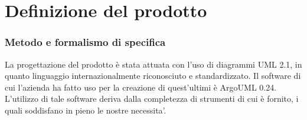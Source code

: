 \documentclass[11pt,titlepage,a4paper]{report}
\begin{document}
\chapter{Definizione del prodotto}
\subsection{Metodo e formalismo di specifica}
La progettazione del prodotto \`e stata attuata con l'uso di diagrammi UML 2.1, in quanto linguaggio internazionalmente riconosciuto e standardizzato.
Il software di cui l’azienda ha fatto uso per la creazione di quest'ultimi \`e ArgoUML 0.24. L'utilizzo di tale software deriva dalla completezza
di strumenti di cui \`e fornito, i quali soddisfano in pieno le nostre necessita'.
\end{document}
